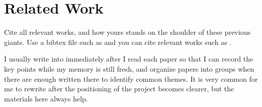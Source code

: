 \section{Related Work}
\label{sec:relatedWork}

Cite all relevant works, and how yours stands on the shoulder of these previous giants.
Use a bibtex file such as  and you can cite relevant works such as \cite{Sun:2016:MVP}.

I usually write into  immediately after I read each paper so that I can record the key points while my memory is still fresh, and organize papers into groups when there are enough written there to identify common themes.
It is very common for me to rewrite after the positioning of the project becomes clearer, but the materials here always help.